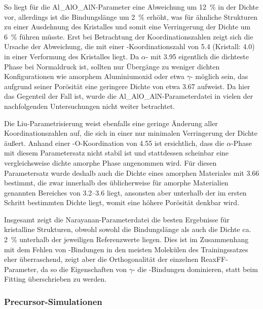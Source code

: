 So liegt für die Al\_AlO\_AlN-Parameter eine Abweichung um \SI{+12}{\percent} in der Dichte vor, allerdings ist die Bindungslänge um \SI{2}{\percent} erhöht, was für ähnliche Strukturen zu einer Ausdehnung des Kristalles und somit eine Verringerung der Dichte um \SI{6}{\percent} führen müsste.
Erst bei Betrachtung der Koordinationszahlen zeigt sich die Ursache der Abweichung, die mit einer -Koordinationszahl von \num{5.4} (Kristall: \num{4.0}) in einer Verformung des Kristalles liegt.
Da $\alpha$- mit \SI{3.95}{\gpcc} eigentlich die dichteste Phase bei Normaldruck ist, sollten nur Übergänge zu weniger dichten Konfigurationen wie amorphem Aluminiumoxid oder etwa $\gamma$- möglich sein, das aufgrund seiner Porösität eine geringere Dichte von etwa \SI{3.67}{\gpcc}\cite{dynys_alpha_1982} aufweist.
Da hier das Gegenteil der Fall ist, wurde die Al\_AlO\_AlN-Parameterdatei in vielen der nachfolgenden Untersuchungen nicht weiter betrachtet.

Die Liu-Parametrisierung weist ebenfalls eine geringe Änderung aller Koordinationszahlen auf, die sich in einer nur minimalen Verringerung der Dichte äußert.
Anhand einer -{O}-Koordination von \num{4.55} ist ersichtlich, dass die $\alpha$-Phase mit diesem Parametersatz nicht stabil ist und stattdessen scheinbar eine vergleichsweise dichte amorphe Phase angenommen wird.
Für diesen Parametersatz wurde deshalb auch die Dichte eines amorphen Materiales mit \SI{3.66}{\gpcc} bestimmt, die zwar innerhalb des üblicherweise für amorphe Materialien genannten Bereiches von \SIrange{3.2}{3.6}{\gpcc} liegt, ansonsten aber unterhalb der im ersten Schritt bestimmten Dichte liegt, womit eine höhere Porösität denkbar wird.

Insgesamt zeigt die Narayanan-Parameterdatei die besten Ergebnisse für kristalline Strukturen, obwohl sowohl die Bindungslänge als auch die Dichte ca. \SI{2}{\percent} unterhalb der jeweiligen Referenzwerte liegen.
Dies ist im Zusammenhang mit dem Fehlen von -Bindungen in den meisten Molekülen des Trainingssatzes eher überraschend, zeigt aber die Orthogonalität der einzelnen ReaxFF-Parameter, da so die Eigenschaften von $\gamma$- die -Bindungen dominieren, statt beim Fitting überschrieben zu werden.

\subsubsection{Precursor-Simulationen}

